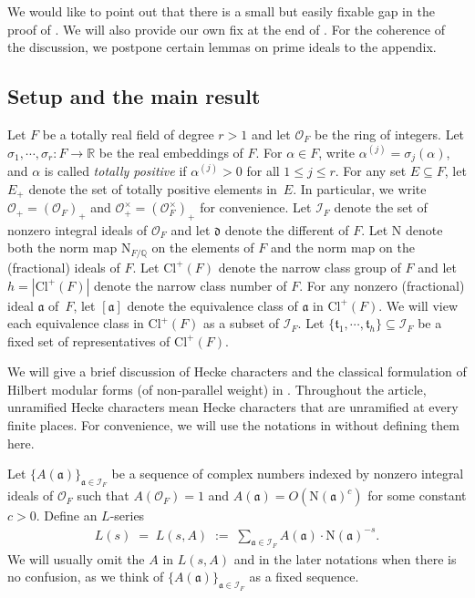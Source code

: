 \documentclass[11pt]{amsart}
\theoremstyle{remark}
\newcommand\cl[1]{\mathcal{#1}}
\newcommand\fr[1]{\mathfrak{#1}}
\newcommand{\rat}{\mathbb{Q}}
\newcommand{\real}{\mathbb{R}}
\newcommand{\clo}{\mathcal{O}}
\newcommand{\eq}{\;=\;}
\newcommand{\deq}{\;:=\;}
\newcommand{\N}{\mathrm{N}}
\newcommand{\Cl}{\mathrm{Cl}}
\begin{document}
We would like to point out that there is a small but easily fixable gap in the proof of \cite[Theorem~2.2]{conjhecke}. We will also provide our own fix at the end of . For the coherence of the discussion, we postpone certain lemmas on prime ideals to the appendix.

\subsection{Setup and the main result}
\label{statement}
Let $F$ be a totally real field of degree $r>1$ and let $\clo_F$ be the ring of integers. Let $\sigma_1,\cdots,\sigma_r:F\rightarrow\real$ be the real embeddings of $F$. For $\alpha\in F$, write $\alpha^{(j)}=\sigma_j(\alpha)$, and $\alpha$ is called \textit{totally positive} if $\alpha^{(j)}>0$ for all $1\leq j\leq r$. For any set $E\subseteq F$, let $E_+$ denote the set of totally positive elements in~$E$. In particular, we write $\clo_+=(\clo_F)_+$ and $\clo^\times_+=(\clo_F^\times)_+$ for convenience. Let $\cl{I}_F$ denote the set of nonzero integral ideals of $\clo_F$ and let $\fr{d}$ denote the different of $F$. Let $\N$ denote both the norm map $\N_{F/\rat}$ on the elements of $F$ and the norm map on the (fractional) ideals of $F$. Let $\Cl^+(F)$ denote the narrow class group of $F$ and let $h=|\Cl^+(F)|$ denote the narrow class number of $F$. For any nonzero (fractional) ideal $\fr{a}$ of~$F$, let $[\fr{a}]$ denote the equivalence class of $\fr{a}$ in $\Cl^+(F)$. We will view each equivalence class in $\Cl^+(F)$ as a subset of $\cl{I}_F$. Let $\{\fr{t}_1,\cdots,\fr{t}_h\}\subseteq\cl{I}_F$ be a fixed set of representatives of $\Cl^+(F)$. 

We will give a brief discussion of Hecke characters and the classical formulation of Hilbert modular forms (of non-parallel weight) in . Throughout the article, unramified Hecke characters mean Hecke characters that are unramified at every finite places. For convenience, we will use the notations in  without defining them here.

Let $\{A(\fr{a})\}_{\fr{a}\in \cl{I}_F}$ be a sequence of complex numbers indexed by nonzero integral ideals of $\clo_F$ such that $A(\clo_F)=1$ and $A(\fr{a})=O(\N(\fr{a})^c)$ for some constant $c>0$. Define an $L$-series
\begin{align*}
    L(s)\eq L(s,A)\deq\sum_{\fr{a}\in\cl{I}_F}A(\fr{a})\cdot \N(\fr{a})^{-s}.
\end{align*}
We will usually omit the $A$ in $L(s,A)$ and in the later notations when there is no confusion, as we think of $\{A(\fr{a})\}_{\fr{a}\in \cl{I}_F}$ as a fixed sequence.
\end{document}

